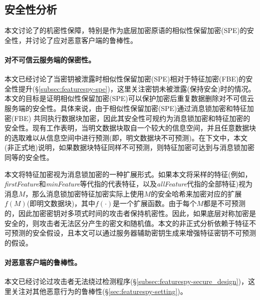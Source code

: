 
\subsection{安全性分析}
\label{subsec:featurespy-security}
本文讨论了\sysnameF 的机密性保障，特别是作为底层加密原语的相似性保留加密(SPE)的安全性，并讨论了\sysnameF 应对恶意客户端的鲁棒性。

\paragraph*{对不可信云服务端的保密性。}

本文已经讨论了当密钥被泄露时相似性保留加密(SPE)相对于特征加密(FBE)的安全性提升(\S\ref{subsec:featurespy-spe})，这里关注密钥未被泄露(保持安全)时的情况。本文的目标是证明相似性保留加密(SPE)可以保护加密后重复数据删除对不可信云服务端的安全性。具体来说，由于相似性保留加密(SPE)通过消息锁加密和特征加密(FBE) 共同执行数据块加密，因此其安全性可规约为消息锁加密和特征加密的安全性。现有工作\cite{bellare2013MLE}表明，当明文数据块取自一个较大的信息空间，并且任意数据块的选取难以从信息空间中进行预测(即，明文数据块不可预测)。在下文中，本文(非正式地)说明，如果数据块特征同样不可预测，则特征加密可达到与消息锁加密同等的安全性。

本文将特征加密视为消息锁加密的一种扩展形式。如果本文将采样的特征(例如，\textit{firstFeature}和\textit{minFeature}等代指的代表特征，以及\textit{allFeature}代指的全部特征)视为消息$M$，那么消息锁加密特征加密实际上使用$M$的安全哈希来加密对应的扩展$f(M)$(即明文数据块)，其中$f(\cdot)$是一个扩展函数。由于每个$M$都是不可预测的，因此加密密钥对多项式时间的攻击者保持机密性。因此，如果底层对称加密是安全的，则攻击者无法区分产生的密文和随机值。本文的非正式分析依赖于特征不可预测的安全假设，且本文可以通过服务器辅助密钥生成\cite{bellare2013DupLESS}来增强特征密钥不可预测的假设。

\paragraph*{对恶意客户端的鲁棒性。}
本文已经讨论过攻击者无法绕过检测程序(\S\ref{subsec:featurespy-secure_design})，这里关注\sysnameF 对其他恶意行为的鲁棒性(\S\ref{sec:featurespy-setting})。


